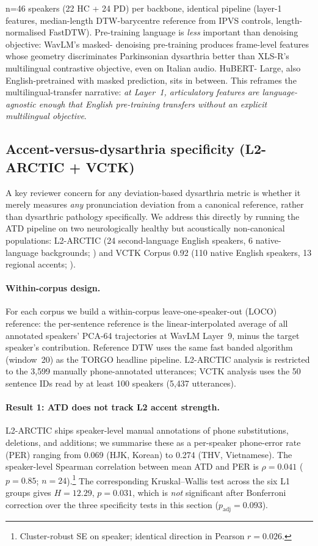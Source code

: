 n=46 speakers (22 HC + 24 PD) per backbone, identical pipeline
(layer-1 features, median-length DTW-barycentre reference from IPVS
controls, length-normalised FastDTW). Pre-training language is
\emph{less} important than denoising objective: WavLM's masked-
denoising pre-training produces frame-level features whose geometry
discriminates Parkinsonian dysarthria better than XLS-R's
multilingual contrastive objective, even on Italian audio. HuBERT-
Large, also English-pretrained with masked prediction, sits in
between. This reframes the multilingual-transfer narrative: \emph{at
Layer~1, articulatory features are language-agnostic enough that
English pre-training transfers without an explicit multilingual
objective}.

\subsection{Accent-versus-dysarthria specificity (L2-ARCTIC + VCTK)}
\label{sec:specificity}

A key reviewer concern for any deviation-based dysarthria metric is
whether it merely measures \emph{any} pronunciation deviation from a
canonical reference, rather than dysarthric pathology specifically.
We address this directly by running the ATD pipeline on two
neurologically healthy but acoustically non-canonical populations:
L2-ARCTIC (24 second-language English speakers, 6 native-language
backgrounds; \cite{Zhao2018L2Arctic}) and VCTK Corpus 0.92
(110 native English speakers, 13 regional accents;
\cite{Veaux2017VCTK}).

\paragraph{Within-corpus design.}
For each corpus we build a within-corpus leave-one-speaker-out (LOCO)
reference: the per-sentence reference is the linear-interpolated
average of all annotated speakers' PCA-64 trajectories at WavLM
Layer~9, minus the target speaker's contribution. Reference DTW uses
the same fast banded algorithm (window~20) as the TORGO headline
pipeline. L2-ARCTIC analysis is restricted to the 3{,}599 manually
phone-annotated utterances; VCTK analysis uses the 50 sentence IDs
read by at least 100 speakers (5{,}437 utterances).

\paragraph{Result 1: ATD does not track L2 accent strength.}
L2-ARCTIC ships speaker-level manual annotations of phone
substitutions, deletions, and additions; we summarise these as a
per-speaker phone-error rate (PER) ranging from 0.069 (HJK, Korean)
to 0.274 (THV, Vietnamese). The speaker-level Spearman correlation
between mean ATD and PER is $\rho = 0.041$ ($p = 0.85$;
$n = 24$).\footnote{Cluster-robust SE on speaker; identical
direction in Pearson $r = 0.026$.}
The corresponding Kruskal--Wallis test across the six L1 groups gives
$H = 12.29$, $p = 0.031$, which is \emph{not} significant after
Bonferroni correction over the three specificity tests in this
section ($p_{\text{adj}} = 0.093$).

